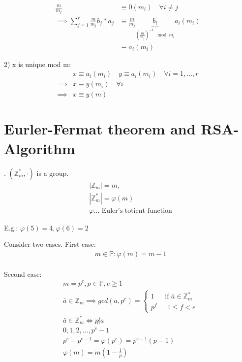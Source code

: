\begin{align*}
  \frac{m}{m_j} &\equiv 0 (m_i) \quad \forall i \neq j \\
  \implies \sum_{j=1}^{r}\frac{m}{m_j} b_j * a_j &\equiv 
    \frac{m}{m_j} \underbrace{b_i}_{(\frac{m}{m_j})^{-1} \mod m_i} a_i (m_i) \\
  &\equiv a_i (m_i)
\end{align*}

2) x is unique mod m:
\begin{align*}
  & x \equiv a_i(m_i) \quad y \equiv a_i (m_i) \quad \forall i = 1,\ldots, r \\
  \implies & x \equiv y (m_i) \quad \forall i \\
  \implies & x \equiv y (m)
\end{align*}

\section{Eurler-Fermat theorem and RSA-Algorithm}

\Theorem.
$(\mathbb{Z}_m^{*}, \cdot)$ is a group.
\begin{align*}
  &|\mathbb{Z}_m| = m, \\
  &|\mathbb{Z}_m^{*}| = \varphi(m) \\
  &\varphi \ldots \text{ Euler's totient function}
\end{align*}

E.g.: $\varphi(5) = 4, \varphi(6) = 2$

Consider two cases. First case:
\begin{align*}
  &m \in \mathbb{P}: \varphi(m) = m-1 \\
\end{align*}

Second case:
\begin{align*}
  &m = p^e, p \in \mathbb{P}, e \geq 1 \\
  &\bar{a}\in \mathbb{Z}_m \implies gcd(a,p^e) = \begin{cases}
    1   &\text{ if $\bar{a} \in \mathbb{Z}_m^{*}$} \\
    p^f &\text{ $1 \leq f < e$} 
  \end{cases} \\
  &\bar{a}\in \mathbb{Z}_m^{*} \Leftrightarrow p \not|a \\
  & 0,1,2, \ldots, p^e -1\\
  & p^e - p^{e-1} = \varphi(p^e) = p^{e-1}(p-1) \\
  & \varphi(m) = m\left(1-\frac{1}{p}\right) 
\end{align*}

